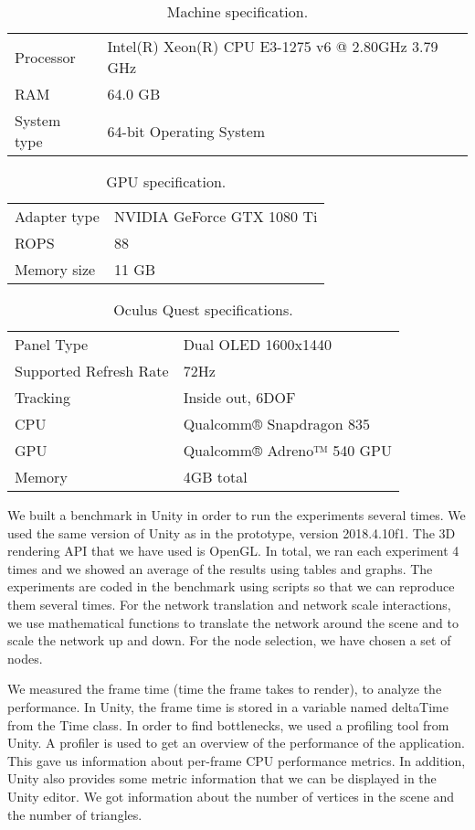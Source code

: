 \begin{table}[h!]
\centering
\begin{tabular}{ll}
Processor   & Intel(R) Xeon(R) CPU E3-1275 v6 @ 2.80GHz 3.79 GHz \\
RAM & 64.0 GB                                            \\
System type & 64-bit Operating System
\end{tabular}
\caption{Machine specification.}
\label{tab:machine-specs}
\end{table}

\begin{table}[h!]
\centering
\begin{tabular}{ll}
Adapter type   & NVIDIA GeForce GTX 1080 Ti \\
ROPS & 88 \\
Memory size & 11 GB \\
\end{tabular}
\caption{GPU specification.}
\label{tab:gpu-specs}
\end{table}

\begin{table}[h!]
\centering
\begin{tabular}{ll}
Panel Type   & Dual OLED 1600x1440 \\
Supported Refresh Rate  &  72Hz \\
Tracking & Inside out, 6DOF \\
CPU & Qualcomm® Snapdragon 835 \\
GPU & Qualcomm® Adreno™ 540 GPU \\
Memory & 4GB total
\end{tabular}
\caption{Oculus Quest specifications.}
\label{tab:oculus-specs}
\end{table}

We built a benchmark in Unity in order to run the experiments several times. We used the same version of Unity as in the prototype, version 2018.4.10f1. The 3D rendering API that we have used is OpenGL. In total, we ran each experiment 4 times and we showed an average of the results using tables and graphs. The experiments are coded in the benchmark using scripts so that we can reproduce them several times. For the network translation and network scale interactions, we use mathematical functions to translate the network around the scene and to scale the network up and down. For the node selection, we have chosen a set of nodes.

We measured the frame time (time the frame takes to render), to analyze the performance. In Unity, the frame time is stored in a variable named deltaTime from the Time class. In order to find bottlenecks, we used a profiling tool from Unity. A profiler is used to get an overview of the performance of the application. This gave us information about per-frame CPU performance metrics. In addition, Unity also provides some metric information that we can be displayed in the Unity editor. We got information about the number of vertices in the scene and the number of triangles.

